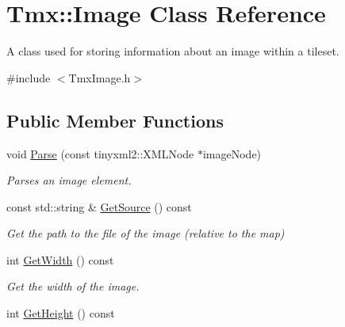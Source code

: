 \hypertarget{classTmx_1_1Image}{\section{Tmx\-:\-:Image Class Reference}
\label{classTmx_1_1Image}
}


A class used for storing information about an image within a tileset.  




{\ttfamily \#include $<$Tmx\-Image.\-h$>$}

\subsection*{Public Member Functions}
\begin{DoxyCompactItemize}
\item 
\hypertarget{classTmx_1_1Image_a505c5bf73141f62dde75661e4702e9ab}{void \hyperlink{classTmx_1_1Image_a505c5bf73141f62dde75661e4702e9ab}{Parse} (const tinyxml2\-::\-X\-M\-L\-Node $\ast$image\-Node)}\label{classTmx_1_1Image_a505c5bf73141f62dde75661e4702e9ab}

\begin{DoxyCompactList}\small\item\em Parses an image element. \end{DoxyCompactList}\item 
\hypertarget{classTmx_1_1Image_ac6dd18e4079d168c222a2db4674e6b0d}{const std\-::string \& \hyperlink{classTmx_1_1Image_ac6dd18e4079d168c222a2db4674e6b0d}{Get\-Source} () const }\label{classTmx_1_1Image_ac6dd18e4079d168c222a2db4674e6b0d}

\begin{DoxyCompactList}\small\item\em Get the path to the file of the image (relative to the map) \end{DoxyCompactList}\item 
\hypertarget{classTmx_1_1Image_a0a85449377d63b40ed4b5cf406985e0a}{int \hyperlink{classTmx_1_1Image_a0a85449377d63b40ed4b5cf406985e0a}{Get\-Width} () const }\label{classTmx_1_1Image_a0a85449377d63b40ed4b5cf406985e0a}

\begin{DoxyCompactList}\small\item\em Get the width of the image. \end{DoxyCompactList}\item 
\hypertarget{classTmx_1_1Image_ad8860e7377cb40715a2ab7c6c9b90eca}{int \hyperlink{classTmx_1_1Image_ad8860e7377cb40715a2ab7c6c9b90eca}{Get\-Height} () const }\label{classTmx_1_1Image_ad8860e7377cb40715a2ab7c6c9b90eca}


\end{DoxyCompactItemize}
